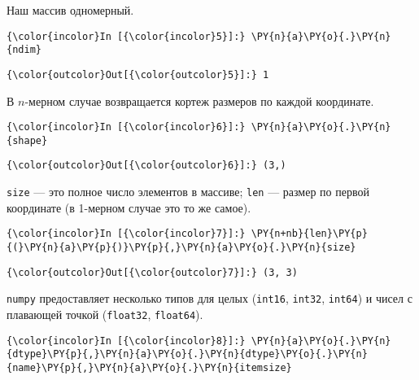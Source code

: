     Наш массив одномерный.

    \begin{Verbatim}[commandchars=\\\{\}]
{\color{incolor}In [{\color{incolor}5}]:} \PY{n}{a}\PY{o}{.}\PY{n}{ndim}
\end{Verbatim}

            \begin{Verbatim}[commandchars=\\\{\}]
{\color{outcolor}Out[{\color{outcolor}5}]:} 1
\end{Verbatim}
        
    В \(n\)-мерном случае возвращается кортеж размеров по каждой координате.

    \begin{Verbatim}[commandchars=\\\{\}]
{\color{incolor}In [{\color{incolor}6}]:} \PY{n}{a}\PY{o}{.}\PY{n}{shape}
\end{Verbatim}

            \begin{Verbatim}[commandchars=\\\{\}]
{\color{outcolor}Out[{\color{outcolor}6}]:} (3,)
\end{Verbatim}
        
    \texttt{size} --- это полное число элементов в массиве; \texttt{len} ---
размер по первой координате (в 1-мерном случае это то же самое).

    \begin{Verbatim}[commandchars=\\\{\}]
{\color{incolor}In [{\color{incolor}7}]:} \PY{n+nb}{len}\PY{p}{(}\PY{n}{a}\PY{p}{)}\PY{p}{,}\PY{n}{a}\PY{o}{.}\PY{n}{size}
\end{Verbatim}

            \begin{Verbatim}[commandchars=\\\{\}]
{\color{outcolor}Out[{\color{outcolor}7}]:} (3, 3)
\end{Verbatim}
        
    \texttt{numpy} предоставляет несколько типов для целых (\texttt{int16},
\texttt{int32}, \texttt{int64}) и чисел с плавающей точкой
(\texttt{float32}, \texttt{float64}).

    \begin{Verbatim}[commandchars=\\\{\}]
{\color{incolor}In [{\color{incolor}8}]:} \PY{n}{a}\PY{o}{.}\PY{n}{dtype}\PY{p}{,}\PY{n}{a}\PY{o}{.}\PY{n}{dtype}\PY{o}{.}\PY{n}{name}\PY{p}{,}\PY{n}{a}\PY{o}{.}\PY{n}{itemsize}
\end{Verbatim}

